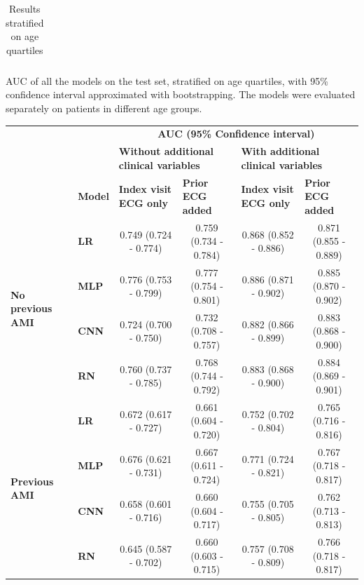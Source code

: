 \documentclass[preprint]{elsarticle}
\begin{document}
\begin{table}[H]
\begin{adjustbox}{center}
\begin{tabular}{@{}llcccc@{}}
\bottomrule
\end{tabular}
\end{adjustbox}
\caption{Results stratified on age quartiles}
\medskip
\small
AUC of all the models on the test set, stratified on age quartiles, with 95\% confidence interval approximated with bootstrapping. The models were evaluated separately on patients in different age groups. 
\label{table:appendix:age}
\end{table}
\renewcommand{\arraystretch}{1}



\renewcommand{\arraystretch}{1.2}
\begin{table}[H]
  \centering
  \scriptsize
\begin{adjustbox}{center}
\begin{tabular}{@{}llcccc@{}}
  \toprule
  & & \multicolumn{4}{c}{\textbf{AUC (95\% Confidence interval)}} \\
  \cmidrule(lr){3-6}
  & & \multicolumn{2}{l}{\textbf{Without additional clinical variables}} & \multicolumn{2}{l}{\textbf{With additional clinical variables}} \\
  \cmidrule(lr){3-4}\cmidrule(lr){5-6}
  & \multicolumn{1}{l}{\textbf{Model}} & \multicolumn{1}{l}{\textbf{Index visit ECG only}} & \multicolumn{1}{l}{\textbf{Prior ECG added}} & \multicolumn{1}{l}{\textbf{Index visit ECG only}} & \multicolumn{1}{l}{\textbf{Prior ECG added}} \\
  \midrule

\multirow{4}{*}{\begin{minipage}{0.65in}\textbf{No previous AMI}\end{minipage}} %
& \textbf{LR} & 0.749 (0.724 - 0.774) & 0.759 (0.734 - 0.784) & 0.868 (0.852 - 0.886) & 0.871 (0.855 - 0.889) \\
& \textbf{MLP} & 0.776 (0.753 - 0.799) & 0.777 (0.754 - 0.801) & 0.886 (0.871 - 0.902) & 0.885 (0.870 - 0.902) \\
& \textbf{CNN} & 0.724 (0.700 - 0.750) & 0.732 (0.708 - 0.757) & 0.882 (0.866 - 0.899) & 0.883 (0.868 - 0.900) \\
& \textbf{RN} & 0.760 (0.737 - 0.785) & 0.768 (0.744 - 0.792) & 0.883 (0.868 - 0.900) & 0.884 (0.869 - 0.901) \\
  \cmidrule(lr){1-2}
\multirow{4}{*}{\begin{minipage}{0.65in}\textbf{Previous AMI}\end{minipage}} %
& \textbf{LR} & 0.672 (0.617 - 0.727) & 0.661 (0.604 - 0.720) & 0.752 (0.702 - 0.804) & 0.765 (0.716 - 0.816) \\
& \textbf{MLP} & 0.676 (0.621 - 0.731) & 0.667 (0.611 - 0.724) & 0.771 (0.724 - 0.821) & 0.767 (0.718 - 0.817) \\
& \textbf{CNN} & 0.658 (0.601 - 0.716) & 0.660 (0.604 - 0.717) & 0.755 (0.705 - 0.805) & 0.762 (0.713 - 0.813) \\
& \textbf{RN} & 0.645 (0.587 - 0.702) & 0.660 (0.603 - 0.715) & 0.757 (0.708 - 0.809) & 0.766 (0.718 - 0.817) \\


\end{tabular}
\end{adjustbox}
\end{table}
\end{document}
